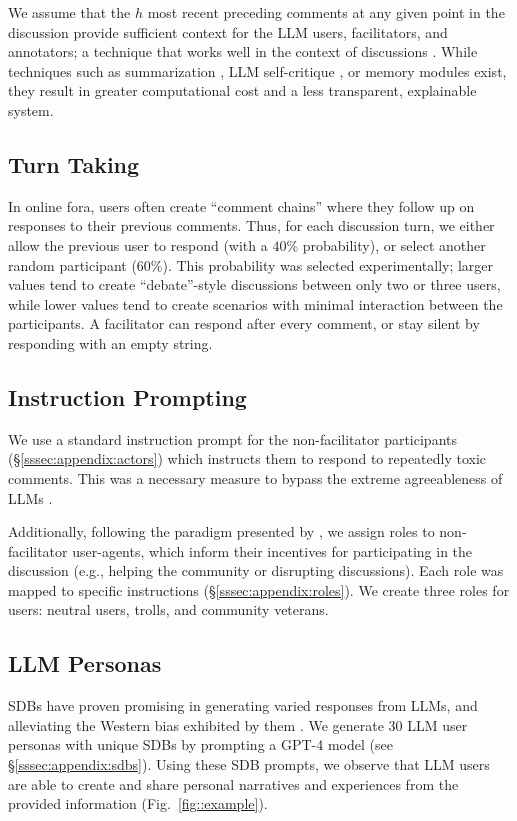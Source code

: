 We assume that the $h$ most recent preceding comments at any given point in the discussion provide sufficient context for the \ac{LLM} users, facilitators, and annotators; a technique that works well in the context of discussions \cite{pavlopoulos_2020_toxicity}. While techniques such as summarization \cite{balog_2024}, \ac{LLM} self-critique \cite{yu_2024_fincon}, or memory modules \cite{Vezhnevets2023GenerativeAM} exist, they result in greater computational cost and a less transparent, explainable system.


\subsection{Turn Taking}
\label{ssec:methodology:turn}

In online fora, users often create ``comment chains'' where they follow up on responses to their previous comments. Thus, for each discussion turn, we either allow the previous user to respond (with a $40\%$ probability), or select another random participant ($60\%$). This probability was selected experimentally; larger values tend to create ``debate''-style discussions between only two or three users, while lower values tend to create scenarios with minimal interaction between the participants. A facilitator can respond after every comment, or stay silent by responding with an empty string.


\subsection{Instruction Prompting}
\label{ssec:methodology:prompts-instructions}

We use a standard instruction prompt for the non-facilitator participants (\S\ref{sssec:appendix:actors}) which instructs them to respond to repeatedly toxic comments. This was a necessary measure to bypass the extreme agreeableness of \acp{LLM}  \cite{park2024generativeagentsimulations1000}.

Additionally, following the paradigm presented by \citet{abdelnabi_negotiations}, we assign roles to non-facilitator user-agents, which inform their incentives for participating in the discussion (e.g., helping the community or disrupting discussions). Each role was mapped to specific instructions (\S\ref{sssec:appendix:roles}). We create three roles for users: neutral users, trolls, and community veterans.    


\subsection{LLM Personas}    
\label{ssec:methodology:prompts-sdb}                

\acfp{SDB} have proven promising in generating varied responses from \acp{LLM}, and alleviating the Western bias exhibited by them \cite{burton2024large}. We generate 30 \ac{LLM} user personas with unique \acp{SDB} by prompting a GPT-4 model \cite{openai2024gpt4technicalreport} (see \S\ref{sssec:appendix:sdbs}). Using these \ac{SDB} prompts, we observe that \ac{LLM} users are able to create and share personal narratives and experiences from the provided information (Fig.~\ref{fig::example}). 